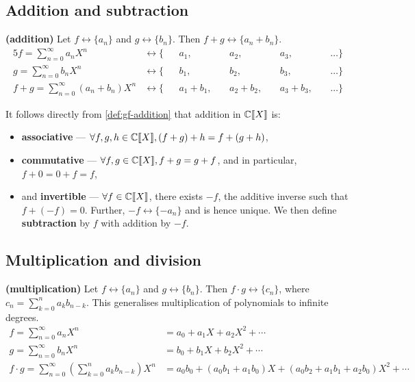 \documentclass[a4paper, 12pt]{report}
\begin{document}
\subsection{Addition and subtraction}
\begin{defn}\label{def:gf-addition}
\textbf{(addition)} Let $f \longleftrightarrow \{a_n\}$ and $g \longleftrightarrow \{b_n\}$. Then $f + g \longleftrightarrow \{a_n + b_n\}$.
\begin{alignat*}{5}
    f = \sum_{n = 0}^\infty a_n X^n &\longleftrightarrow \{&&a_1, &&a_2, &&a_3, &&\dots\}\\
    g = \sum_{n = 0}^\infty b_n X^n &\longleftrightarrow \{&&b_1, &&b_2, &&b_3, &&\dots\}\\
    f + g = \sum_{n = 0}^\infty (a_n + b_n) X^n &\longleftrightarrow \{&&a_1 + b_1,~&&a_2 + b_2,~&&a_3 + b_3,~&&\dots\}
\end{alignat*}
\end{defn}
\begin{rem}\label{rem:gf-addition-properties}
It follows directly from \cref{def:gf-addition} that addition in $\mathbb{C}\llbracket X \rrbracket$ is:
\begin{itemize}
    \item \textbf{associative} --- $\forall f, g, h \in \mathbb{C}\llbracket X \rrbracket, (f + g) + h = f + (g + h)$,
    \item \textbf{commutative} --- $\forall f, g \in \mathbb{C}\llbracket X \rrbracket, f + g = g + f$, and in particular, $f + 0 = 0 + f = f$,
    \item and \textbf{invertible} --- $\forall f \in \mathbb{C}\llbracket X \rrbracket$, there exists $-f$, the additive inverse such that $f + (-f) = 0$. Further, $-f \longleftrightarrow \{-a_n\}$ and is hence unique. We then define \textbf{subtraction} by $f$ with addition by $-f$.
\end{itemize}
\end{rem}

\subsection{Multiplication and division}
\begin{defn}\label{def:gf-multiplication}
\textbf{(multiplication)} Let $f \longleftrightarrow \{a_n\}$ and $g \longleftrightarrow \{b_n\}$. Then $f \cdot g \longleftrightarrow \{c_n\}$, where $c_n = \sum_{k = 0}^{n} a_k b_{n - k}$. This generalises multiplication of polynomials to infinite degrees.
\begin{align*}
f = \sum_{n = 0}^\infty a_n X^n &= a_0 + a_1 X + a_2 X^2 + \cdots\\
g = \sum_{n = 0}^\infty b_n X^n &= b_0 + b_1 X + b_2 X^2 + \cdots\\
f \cdot g = \sum_{n = 0}^\infty \left(\sum_{k = 0}^n a_k b_{n - k}\right) X^n &= a_0 b_0 + (a_0 b_1 + a_1 b_0) X + (a_0 b_2 + a_1 b_1 + a_2 b_0) X^2 + \cdots\\
\end{align*}
\end{defn}
\end{document}
